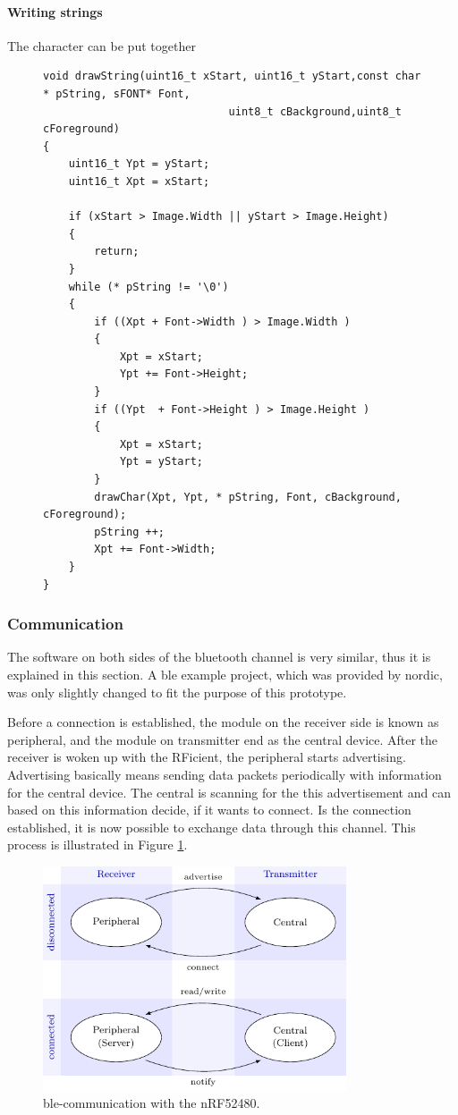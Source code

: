 \paragraph{Writing strings}
The character can be put together 

\begin{figure}[ht!]
\begin{lstlisting}
void drawString(uint16_t xStart, uint16_t yStart,const char * pString, sFONT* Font,
							 uint8_t cBackground,uint8_t cForeground) 
{
	uint16_t Ypt = yStart;
	uint16_t Xpt = xStart;
	
	if (xStart > Image.Width || yStart > Image.Height)
	{
		return;
	}
	while (* pString != '\0') 
	{
		if ((Xpt + Font->Width ) > Image.Width ) 
		{
			Xpt = xStart;
			Ypt += Font->Height;
		}
		if ((Ypt  + Font->Height ) > Image.Height ) 
		{
			Xpt = xStart;
			Ypt = yStart;
		}
		drawChar(Xpt, Ypt, * pString, Font, cBackground, cForeground);
		pString ++;
		Xpt += Font->Width;
	}
}	
\end{lstlisting}
\end{figure}


\subsubsection{Communication}
The software on both sides of the bluetooth channel is very similar, thus it is explained in this section.
A \acs{ble} example project, which was provided by nordic, was only slightly changed to fit the purpose of this prototype.

Before a connection is established, the module on the receiver side is known as peripheral, and the module on transmitter end as the central device.
After the receiver is woken up with the RFicient, the peripheral starts advertising.
Advertising basically means sending data packets periodically with information for the central device.
The central is scanning for the this advertisement and can based on this information decide, if it wants to connect.
Is the connection established, it is now possible to exchange data through this channel.
This process is illustrated in Figure \ref{software:ble}.
\begin{figure}[ht]
	\centering
	\includegraphics[width=0.8\textwidth]{4-development/software/graphics/ble.pdf}
	\caption{\acs{ble}-communication with the nRF52480.\label{software:ble}}
\end{figure}

